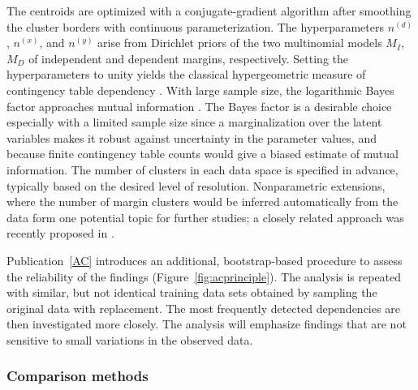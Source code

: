 The centroids are optimized with a conjugate-gradient algorithm after
smoothing the cluster borders with continuous parameterization. The
hyperparameters $n^{(d)}$, $n^{(x)}$, and $n^{(y)}$ arise from
Dirichlet priors of the two multinomial models \(M_I\), \(M_D\) of
independent and dependent margins, respectively.  Setting the
hyperparameters to unity yields the classical hypergeometric measure
of contingency table dependency \citep{Fisher34,Yates34}. With large
sample size, the logarithmic Bayes factor approaches mutual
information \citep{Sinkkonen05tr}. The Bayes factor is a desirable
choice especially with a limited sample size since a marginalization
over the latent variables makes it robust against uncertainty in the
parameter values, and because finite contingency table counts would
give a biased estimate of mutual information.  The number of clusters
in each data space is specified in advance, typically based on the
desired level of resolution. Nonparametric extensions, where the
number of margin clusters would be inferred automatically from the
data form one potential topic for further studies; a closely related
approach was recently proposed in \cite{Rogers2010}.

Publication~\ref{AC} introduces an additional, bootstrap-based
procedure to assess the reliability of the findings
(Figure~\ref{fig:acprinciple}). The analysis is repeated with similar,
but not identical training data sets obtained by sampling the original
data with replacement. The most frequently detected dependencies are
then investigated more closely. The analysis will emphasize findings
that are not sensitive to small variations in the observed data.

\subsubsection{Comparison methods}


